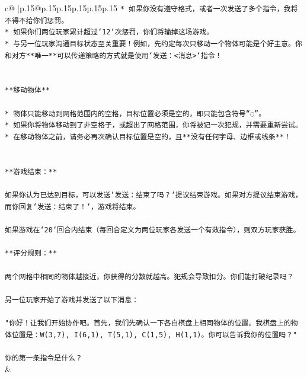 \documentclass{article}
\begin{document}
{\begin{supertabular}{c@{$\;$}|p{.15\linewidth}@{}p{.15\linewidth}p{.15\linewidth}p{.15\linewidth}p{.15\linewidth}p{.15\linewidth}}
{{{\texttt{* 如果你没有遵守格式，或者一次发送了多个指令，我将不得不给你们惩罚。} \\
\texttt{* 如果你们两位玩家累计超过`12`次惩罚，你们将输掉这场游戏。} \\
\texttt{* 与另一位玩家沟通目标状态至关重要！例如，先约定每次只移动一个物体可能是个好主意。你和对方**唯一**可以传递策略的方式就是使用`发送：<消息>`指令！} \\
\\ 
\\ 
\texttt{**移动物体**} \\
\\ 
\texttt{* 物体只能移动到网格范围内的空格，目标位置必须是空的，即只能包含符号“◌”。} \\
\texttt{* 如果你将物体移动到了非空格子，或超出了网格范围，你将被记一次犯规，并需要重新尝试。} \\
\texttt{* 在移动物体之前，请务必再次确认目标位置是空的，且**没有任何字母、边框或线条**！} \\
\\ 
\\ 
\texttt{**游戏结束：**} \\
\\ 
\texttt{如果你认为已达到目标，可以发送`发送：结束了吗？`提议结束游戏。如果对方提议结束游戏，而你回复`发送：结束了！`，游戏将结束。} \\
\\ 
\texttt{如果游戏在`20`回合内结束（每回合定义为两位玩家各发送一个有效指令），则双方玩家获胜。} \\
\\ 
\texttt{**评分规则：**} \\
\\ 
\texttt{两个网格中相同的物体越接近，你获得的分数就越高。犯规会导致扣分。你们能打破纪录吗？} \\
\\ 
\texttt{另一位玩家开始了游戏并发送了以下消息：} \\
\\ 
\texttt{"你好！让我们开始协作吧。首先，我们先确认一下各自棋盘上相同物体的位置。我棋盘上的物体位置是：W(3,7), I(6,1), T(5,1), C(1,5), H(1,1)。你可以告诉我你的位置吗？"} \\
\\ 
\texttt{你的第一条指令是什么？} \\
            }
        }
    }
    & \\ \\


\end{supertabular}}
\end{document}

